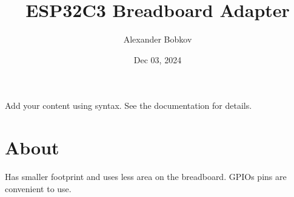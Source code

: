 \documentclass[letterpaper,8pt,english]{sphinxmanual}
\title{ESP32\sphinxhyphen{}C3 Breadboard Adapter}
\date{Dec 03, 2024}
\author{Alexander Bobkov}
\begin{document}
\pagestyle{empty}
\sphinxmaketitle
\pagestyle{plain}
\sphinxtableofcontents
\pagestyle{normal}
\label{\detokenize{index::doc}}


\sphinxAtStartPar
Add your content using  syntax. See the
documentation for details.


\chapter{About}
\label{\detokenize{about:about}}\label{\detokenize{about::doc}}
\noindent{}

\sphinxAtStartPar
Has smaller footprint and uses less area on the breadboard. GPIOs pins are convenient to use.
\end{document}
